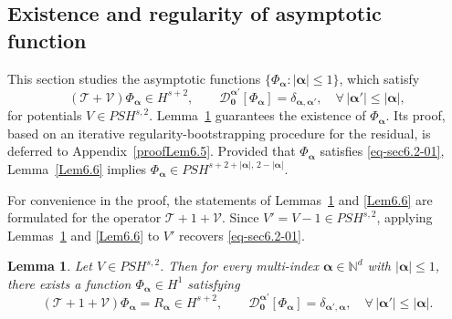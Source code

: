 \documentclass{sn-jnl}%
\numberwithin{equation}{section}
\theoremstyle{thmstyleone}%
\newtheorem{lemma}{Lemma}[section]%
\theoremstyle{thmstyletwo}%
\theoremstyle{thmstylethree}%
\begin{document}
\subsection{Existence and regularity of asymptotic function}\label{subsec:AR2}
This section studies the asymptotic functions 
$\{\Phi_{\bm \alpha} : |\bm \alpha| \leq 1\}$, which satisfy
\begin{equation}\label{eq-sec6.2-01}
(\mathcal{T}+\mathcal{V}) \Phi_{\bm \alpha} \in H^{s+2}, 
\qquad 
\mathcal{D}_{\bm 0}^{\bm \alpha'}[\Phi_{\bm \alpha}] = \delta_{\bm \alpha,\bm \alpha'}, 
\quad \forall\, |\bm \alpha'|\leq |\bm \alpha|,
\end{equation}
for potentials $V \in PSH^{s,2}$. Lemma~\ref{Lem6.5} guarantees the existence of $\Phi_{\bm \alpha}$. Its proof, based on an iterative regularity-bootstrapping procedure for the residual, is deferred to Appendix~\ref{proofLem6.5}.
Provided that $\Phi_{\bm \alpha}$ satisfies \eqref{eq-sec6.2-01}, Lemma~\ref{Lem6.6} implies
$
\Phi_{\bm \alpha} \in PSH^{s+2+|\bm \alpha|,\,2-|\bm \alpha|}.
$

For convenience in the proof, the statements of Lemmas~\ref{Lem6.5} and \ref{Lem6.6} are formulated for the operator $\mathcal{T}+1+\mathcal{V}$.
Since $V'=V-1\in PSH^{s,2}$, applying  Lemmas~\ref{Lem6.5} and \ref{Lem6.6} to $V'$ recovers \eqref{eq-sec6.2-01}.

\begin{lemma}\label{Lem6.5}
Let $V \in PSH^{s,2}$. 
Then for every multi-index $\bm \alpha \in \mathbb{N}^d$ with $|\bm \alpha| \leq 1$, there exists a function $\Phi_{\bm \alpha} \in H^1$ satisfying
\begin{equation}\label{eq-Lem6.5-01}
(\mathcal{T}+1+\mathcal{V}) \Phi_{\bm \alpha} = R_{\bm \alpha}\in H^{s+2}, 
\qquad 
\mathcal{D}^{\bm \alpha'}_{\bm 0}[\Phi_{\bm \alpha}] = \delta_{\bm \alpha',\bm \alpha}, 
\quad \forall\, |\bm \alpha'|\leq |\bm \alpha|.
\end{equation}
\end{lemma}
\end{document}
